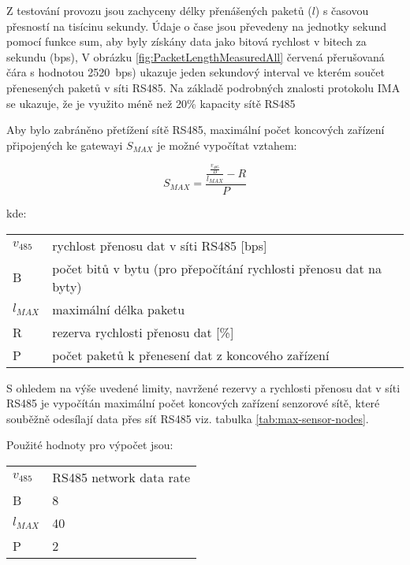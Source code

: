 Z testování provozu jsou zachyceny délky přenášených paketů ($ l $) s časovou přesností na tisícinu sekundy. Údaje o čase jsou převedeny na jednotky sekund pomocí funkce sum, aby byly získány data jako bitová rychlost v bitech za sekundu (bps),
V obrázku \ref{fig:PacketLengthMeasuredAll} červená přerušovaná čára s hodnotou 2520~bps) ukazuje jeden sekundový interval ve kterém součet přenesených paketů v síti RS485.
Na základě podrobných znalosti protokolu IMA se ukazuje, že je využito méně než 20\% kapacity sítě RS485 

Aby bylo zabráněno přetížení sítě RS485, maximální počet koncových zařízení připojených ke gatewayi $ S_{MAX} $ je možné vypočítat vztahem:

\begin{equation}
S_{MAX} = \frac{\frac{\frac{v_{485}}{B}}{l_{MAX}} - R}{P}
\label{equ:max-count-of-sensors}
\end{equation}

kde:

\begin{tabular}{l @{  } l}
$v_{485}$ & rychlost přenosu dat v síti RS485 [bps]\\
 B        & počet bitů v bytu (pro přepočítání rychlosti přenosu dat na byty) \\
$l_{MAX}$ & maximální délka paketu \\
 R        & rezerva rychlosti přenosu dat [\%]\\
 P        & počet paketů k přenesení dat z koncového zařízení \\
\end{tabular}


S ohledem na výše uvedené limity, navržené rezervy a rychlosti přenosu dat v síti RS485 je vypočítán maximální počet koncových zařízení senzorové sítě, které souběžně odesílají data přes síť RS485 viz. tabulka \ref{tab:max-sensor-nodes}.

Použité hodnoty pro výpočet jsou:

\begin{tabular}{l @{ $=$ } l}
$v_{485}$ & RS485 network data rate \\
 B        & 8 \\
$l_{MAX}$ & 40 \\
 P        & 2 \\
\end{tabular}


\newpage

